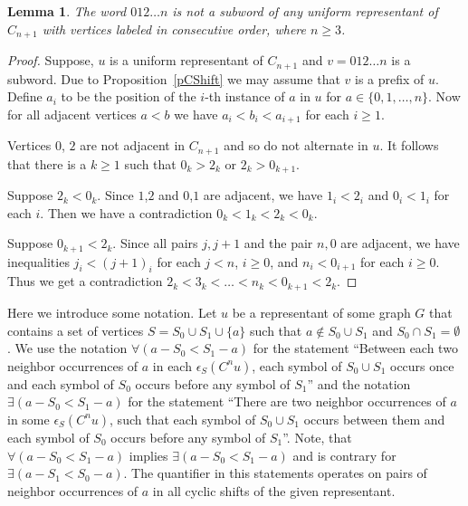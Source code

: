 \documentclass[12pt]{article}
\newtheorem{lemma}[theorem]{Lemma}
\begin{document}
\begin{lemma}\label{lCycleRep} The word $012\ldots n$ is not a subword of any uniform representant of $C_{n+1}$ with vertices labeled in consecutive order, where $n \geqslant 3$.
\end{lemma}
\begin{proof} Suppose, $u$ is a uniform representant of $C_{n+1}$ and $v=012\ldots n$ is a subword. Due to Proposition~\ref{pCShift} we may assume that $v$ is a prefix of $u$. Define $a_i$ to be the position of the $i$-th instance of $a$ in $u$ for $a \in \{0,1,\ldots,n\}$. Now for all adjacent vertices $a<b$ we have $a_i<b_i<a_{i+1}$ for each $i \geqslant 1$.

Vertices $0$, $2$ are not adjacent in $C_{n+1}$ and so do not alternate in $u$. It follows that there is a $k \geqslant 1$ such that $0_k>2_k$ or $2_{k}>0_{k+1}$.

Suppose $2_k<0_k$. Since $1$,$2$ and $0$,$1$ are adjacent, we have $1_i<2_i$ and $0_i<1_i$ for each $i$. Then we have a contradiction $0_k<1_k<2_k<0_k$.

Suppose $0_{k+1}<2_k$. Since all pairs $j,j+1$ and the pair $n,0$ are adjacent, we have inequalities $j_i<(j+1)_i$ for each $j<n$, $i \geqslant 0$, and $n_i<0_{i+1}$ for each $i \geqslant 0$. Thus we get a contradiction $2_k<3_k<\ldots <n_k<0_{k+1}<2_k$.
\end{proof}

Here we introduce some notation. Let $u$ be a representant of some graph $G$ that contains a set of vertices $S=S_0 \cup S_1 \cup \{a\}$ such that $a\not \in S_0\cup S_1$ and $S_0\cap S_1 = \emptyset$. We use the notation $\forall (a-S_0<S_1-a)$ for the statement ``Between each two neighbor occurrences of $a$ in each $\epsilon_S(C^nu)$, each symbol of $S_0\cup S_1$ occurs once and each symbol of $S_0$ occurs before any symbol of $S_1$'' and the notation $\exists (a-S_0<S_1-a)$ for the statement ``There are two neighbor occurrences of $a$ in some $\epsilon_S(C^nu)$, such that each symbol of $S_0\cup S_1$ occurs between them and each symbol of $S_0$ occurs before any symbol of $S_1$''. Note, that $\forall (a-S_0<S_1-a)$ implies $\exists (a-S_0<S_1-a)$ and is contrary for $\exists (a-S_1<S_0-a)$. The quantifier in this statements operates on pairs of neighbor occurrences of $a$ in all cyclic shifts of the given representant.
\end{document}

